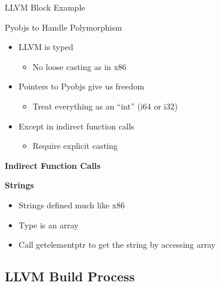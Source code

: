 \documentclass{beamer}
\begin{document}
\begin{frame}[shrink]{LLVM Block Example}
  
\end{frame}

\begin{frame}{Pyobjs to Handle Polymorphism}
\begin{itemize}
  \item<1->LLVM is typed
    \begin{itemize}
    \item No loose casting as in x86
    \end{itemize}
  \item<2->Pointers to Pyobjs give us freedom
    \begin{itemize}
    \item Treat everything as an ``int'' (i64 or i32)
    \end{itemize}
  \item<3->Except in indirect function calls
    \begin{itemize}
    \item Require explicit casting
    \end{itemize}
\end{itemize}
\end{frame}

\begin{frame}{\bf Indirect Function Calls}
  
\end{frame}

\begin{frame}[shrink]{\bf Strings}
  \begin{itemize}
  \item<1->Strings defined much like x86
  \item<2->Type is an array
  \item<3->Call getelementptr to get the string by accessing array
  \end{itemize}
\end{frame}

\subsection{LLVM Build Process}
\end{document}
